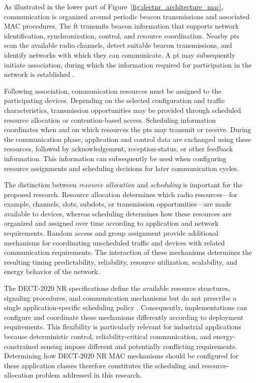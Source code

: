 \documentclass[12pt,a4paper]{article}
\begin{document}
As illustrated in the lower part of Figure~\ref{fig:dectnr_architecture_mac}, communication is organized around periodic beacon transmissions and associated MAC procedures. The \gls{ft} transmits beacon information that supports network identification, synchronization, control, and resource coordination. Nearby \glspl{pt} scan the available radio channels, detect suitable beacon transmissions, and identify networks with which they can communicate. A \gls{pt} may subsequently initiate association, during which the information required for participation in the network is established \cite{etsi_ts103636_4}.

Following association, communication resources must be assigned to the participating devices. Depending on the selected configuration and traffic characteristics, transmission opportunities may be provided through scheduled resource allocation or contention-based access. Scheduling information coordinates when and on which resources the \glspl{pt} may transmit or receive. During the communication phase, application and control data are exchanged using these resources, followed by acknowledgement, reception-status, or other feedback information. This information can subsequently be used when configuring resource assignments and scheduling decisions for later communication cycles.

The distinction between \textit{resource allocation} and \textit{scheduling} is important for the proposed research. Resource allocation determines which radio resources---for example, channels, slots, subslots, or transmission opportunities---are made available to devices, whereas scheduling determines how these resources are organized and assigned over time according to application and network requirements. Random access and group assignment provide additional mechanisms for coordinating unscheduled traffic and devices with related communication requirements. The interaction of these mechanisms determines the resulting timing predictability, reliability, resource utilization, scalability, and energy behavior of the network.

The DECT-2020 NR specifications define the available resource structures, signaling procedures, and communication mechanisms but do not prescribe a single application-specific scheduling policy \cite{etsi_ts103636_3,etsi_ts103636_4}. Consequently, implementations can configure and coordinate these mechanisms differently according to deployment requirements. This flexibility is particularly relevant for industrial applications because deterministic control, reliability-critical communication, and energy-constrained sensing impose different and potentially conflicting requirements. Determining how DECT-2020 NR MAC mechanisms should be configured for these application classes therefore constitutes the scheduling and resource-allocation problem addressed in this research.
\end{document}
